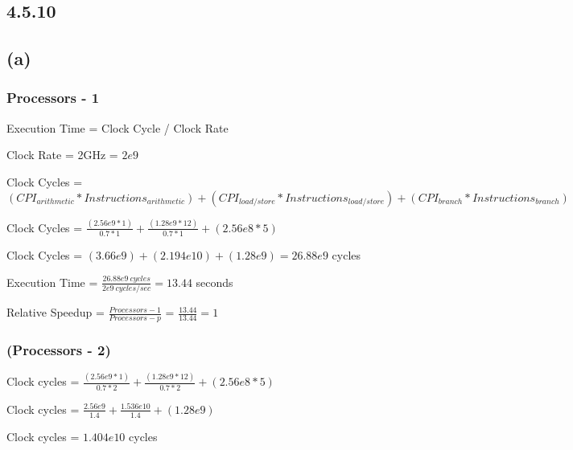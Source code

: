 \documentclass{article}
\begin{document}
    \subsection*{4.5.10}

    \subsection*{(a)}

    \subsubsection*{Processors - 1}

    Execution Time = Clock Cycle / Clock Rate

    Clock Rate = 2GHz = $2e9$

    \vspace*{6pt}

    Clock Cycles = $(CPI_{arithmetic} * Instructions_{arithmetic}) + (CPI_{load/store} * Instructions_{load/store}) + (CPI_{branch} * Instructions_{branch}) $

    \vspace*{6pt}

    Clock Cycles = $\frac{(2.56e9 * 1)}{0.7 * 1} + \frac{(1.28e9 * 12) }{0.7 * 1}+ (2.56e8 * 5)$

    Clock Cycles = $(3.66e9) + (2.194e{10}) + (1.28e9) = 26.88e9$ cycles

    Execution Time = $\frac{26.88e9\ cycles}{2e9\ cycles/sec} = 13.44$ seconds
    
    \vspace*{6pt}

    Relative Speedup = $\frac{Processors - 1}{Processors - p}$ = $\frac{13.44}{13.44} = 1$

    \subsubsection*{(Processors - 2)}

    Clock cycles = $\frac{(2.56e9 * 1)}{0.7 * 2} + \frac{(1.28e9 * 12)}{0.7*2} + (2.56e8 * 5)$

    \vspace*{6pt}

    Clock cycles = $\frac{2.56e9}{1.4} + \frac{1.536e{10}}{1.4} + (1.28e9) $
    
    \vspace*{6pt}

    Clock cycles = $1.404e10$ cycles
    \vspace*{6pt}
    
\end{document}
